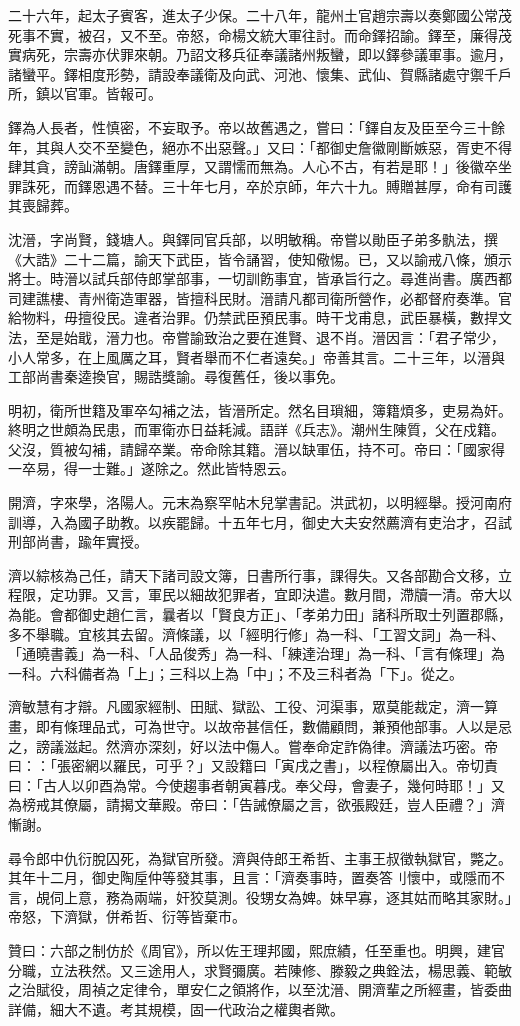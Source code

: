 \begin{pinyinscope}
二十六年，起太子賓客，進太子少保。二十八年，龍州土官趙宗壽以奏鄭國公常茂死事不實，被召，又不至。帝怒，命楊文統大軍往討。而命鐸招諭。鐸至，廉得茂實病死，宗壽亦伏罪來朝。乃詔文移兵征奉議諸州叛蠻，即以鐸參議軍事。逾月，諸蠻平。鐸相度形勢，請設奉議衛及向武、河池、懷集、武仙、賀縣諸處守禦千戶所，鎮以官軍。皆報可。

鐸為人長者，性慎密，不妄取予。帝以故舊遇之，嘗曰：「鐸自友及臣至今三十餘年，其與人交不至變色，絕亦不出惡聲。」又曰：「都御史詹徽剛斷嫉惡，胥吏不得肆其貪，謗訕滿朝。唐鐸重厚，又謂懦而無為。人心不古，有若是耶！」後徽卒坐罪誅死，而鐸恩遇不替。三十年七月，卒於京師，年六十九。賻贈甚厚，命有司護其喪歸葬。

沈溍，字尚賢，錢塘人。與鐸同官兵部，以明敏稱。帝嘗以勛臣子弟多骫法，撰《大誥》二十二篇，諭天下武臣，皆令誦習，使知儆惕。已，又以諭戒八條，頒示將士。時溍以試兵部侍郎掌部事，一切訓飭事宜，皆承旨行之。尋進尚書。廣西都司建譙樓、青州衛造軍器，皆擅科民財。溍請凡都司衛所營作，必都督府奏準。官給物料，毋擅役民。違者治罪。仍禁武臣預民事。時干戈甫息，武臣暴橫，數捍文法，至是始戢，溍力也。帝嘗諭致治之要在進賢、退不肖。溍因言：「君子常少，小人常多，在上風厲之耳，賢者舉而不仁者遠矣。」帝善其言。二十三年，以溍與工部尚書秦逵換官，賜誥獎諭。尋復舊任，後以事免。

明初，衛所世籍及軍卒勾補之法，皆溍所定。然名目瑣細，簿籍煩多，吏易為奸。終明之世頗為民患，而軍衛亦日益耗減。語詳《兵志》。潮州生陳質，父在戍籍。父沒，質被勾補，請歸卒業。帝命除其籍。溍以缺軍伍，持不可。帝曰：「國家得一卒易，得一士難。」遂除之。然此皆特恩云。

開濟，字來學，洛陽人。元末為察罕帖木兒掌書記。洪武初，以明經舉。授河南府訓導，入為國子助教。以疾罷歸。十五年七月，御史大夫安然薦濟有吏治才，召試刑部尚書，踰年實授。

濟以綜核為己任，請天下諸司設文簿，日書所行事，課得失。又各部勘合文移，立程限，定功罪。又言，軍民以細故犯罪者，宜即決遣。數月間，滯牘一清。帝大以為能。會都御史趙仁言，曩者以「賢良方正」、「孝弟力田」諸科所取士列置郡縣，多不舉職。宜核其去留。濟條議，以「經明行修」為一科、「工習文詞」為一科、「通曉書義」為一科、「人品俊秀」為一科、「練達治理」為一科、「言有條理」為一科。六科備者為「上」；三科以上為「中」；不及三科者為「下」。從之。

濟敏慧有才辯。凡國家經制、田賦、獄訟、工役、河渠事，眾莫能裁定，濟一算畫，即有條理品式，可為世守。以故帝甚信任，數備顧問，兼預他部事。人以是忌之，謗議滋起。然濟亦深刻，好以法中傷人。嘗奉命定詐偽律。濟議法巧密。帝曰：：「張密網以羅民，可乎？」又設籍曰「寅戌之書」，以程僚屬出入。帝切責曰：「古人以卯酉為常。今使趨事者朝寅暮戌。奉父母，會妻子，幾何時耶！」又為榜戒其僚屬，請揭文華殿。帝曰：「告誡僚屬之言，欲張殿廷，豈人臣禮？」濟慚謝。

尋令郎中仇衍脫囚死，為獄官所發。濟與侍郎王希哲、主事王叔徵執獄官，斃之。其年十二月，御史陶垕仲等發其事，且言：「濟奏事時，置奏答刂懷中，或隱而不言，覘伺上意，務為兩端，奸狡莫測。役甥女為婢。妹早寡，逐其姑而略其家財。」帝怒，下濟獄，併希哲、衍等皆棄市。

贊曰：六部之制仿於《周官》，所以佐王理邦國，熙庶績，任至重也。明興，建官分職，立法秩然。又三途用人，求賢彌廣。若陳修、滕毅之典銓法，楊思義、範敏之治賦役，周禎之定律令，單安仁之領將作，以至沈溍、開濟輩之所經畫，皆委曲詳備，細大不遺。考其規模，固一代政治之權輿者歟。


\end{pinyinscope}
